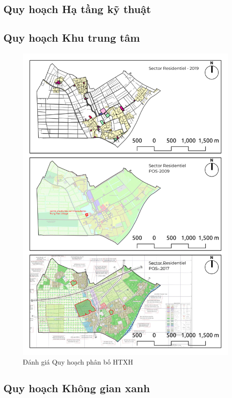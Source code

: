 \documentclass[../thesis.tex]{subfiles}
\begin{document}
\subsection {Quy hoạch Hạ tầng kỹ thuật}

\subsection {Quy hoạch Khu trung tâm}
\begin{figure}
\caption{Đánh giá Quy hoạch phân bố HTXH}
\includegraphics[width=15cm]{Graphic/TC5-QH-KTT.jpg}
\end{figure}
\clearpage
\subsection {Quy hoạch Không gian xanh}
\end{document}
